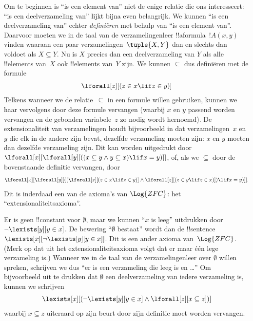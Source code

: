 \documentclass[openany]{memoir}
\begin{document}
Om te beginnen is ``is een element van'' niet de enige relatie die ons
interesseert: ``is een deelverzameling van'' lijkt bijna even
belangrijk. We kunnen ``is een deelverzameling van'' echter
\emph{definiëren} met behulp van ``is een element van''. Daarvoor
moeten we in de taal van de verzamelingenleer !!a{formula}~$!A(x, y)$
vinden waaraan een paar verzamelingen~$\tuple{X, Y}$ dan en slechts dan
voldoet als $X \subseteq Y$. Nu is $X$ precies dan een deelverzameling
van $Y$ als alle !!{element}s van~$X$ ook !!{element}s van~$Y$ zijn.
We kunnen $\subseteq$ dus definiëren met de formule
\[
\lforall[z][(z \in x \lif z \in y)]
\]
Telkens wanneer we de relatie~$\subseteq$ in een formule willen
gebruiken, kunnen we haar vervolgens door deze formule vervangen
(waarbij $x$ en $y$ passend worden vervangen en de gebonden
variabele~$z$ zo nodig wordt hernoemd). De extensionaliteit van
verzamelingen houdt bijvoorbeeld in dat verzamelingen~$x$ en $y$ die
elk in de andere zijn bevat, dezelfde verzameling moeten zijn: $x$ en
$y$ moeten dan dezelfde verzameling zijn. Dit kan
worden uitgedrukt door $\lforall[x][\lforall[y][((x \subseteq y \land y
    \subseteq x) \lif x = y)]]$, of, als we $\subseteq$ door de
bovenstaande definitie vervangen, door
\[
\lforall[x][\lforall[y][((\lforall[z][(z \in x \lif z \in y)] \land
    \lforall[z][(z \in y \lif z \in x)]) \lif x = y)]].
\]
Dit is inderdaad een van de axioma's van $\Log{ZFC}$: het
``extensionaliteitsaxioma''.

Er is geen !!{constant} voor $\emptyset$, maar we kunnen ``$x$ is
leeg'' uitdrukken door $\lnot \lexists[y][y \in x]$. De bewering
``$\emptyset$ bestaat'' wordt dan de !!{sentence}~$\lexists[x][\lnot
\lexists[y][y \in x]]$. Dit is een ander axioma van~$\Log{ZFC}$.
(Merk op dat uit het extensionaliteitsaxioma volgt dat er maar één lege
verzameling is.) Wanneer we in de taal van de verzamelingenleer over
$\emptyset$ willen spreken, schrijven we dus ``er is een verzameling
die leeg is en \dots'' Om bijvoorbeeld uit te drukken dat $\emptyset$
een deelverzameling van iedere verzameling is, kunnen we schrijven
\[
\lexists[x][(\lnot\lexists[y][y \in x] \land \lforall[z][x \subseteq
    z])]
\]
waarbij $x \subseteq z$ uiteraard op zijn beurt door zijn definitie
moet worden vervangen.
\end{document}
